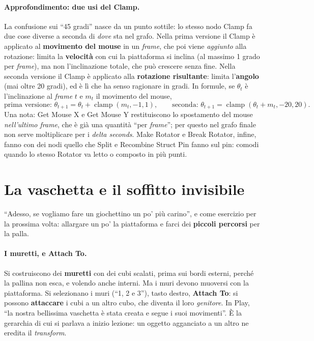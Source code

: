 \paragraph{Approfondimento: due usi del Clamp.} La confusione sui ``45 gradi'' nasce da
un punto sottile: lo stesso nodo Clamp fa due cose diverse a seconda di \emph{dove} sta
nel grafo. Nella prima versione il Clamp è applicato al \textbf{movimento del mouse} in
un \emph{frame}, che poi viene \emph{aggiunto} alla rotazione: limita la
\textbf{velocità} con cui la piattaforma si inclina (al massimo 1 grado per
\emph{frame}), ma non l'inclinazione totale, che può crescere senza fine. Nella seconda
versione il Clamp è applicato alla \textbf{rotazione risultante}: limita
l'\textbf{angolo} (mai oltre 20 gradi), ed è lì che ha senso ragionare in gradi. In
formule, se $\theta_t$ è l'inclinazione al \emph{frame} $t$ e $m_t$ il movimento del
mouse,
\[
  \text{prima versione: } \theta_{t+1} = \theta_t + \operatorname{clamp}(m_t, -1, 1),
  \qquad
  \text{seconda: } \theta_{t+1} = \operatorname{clamp}(\theta_t + m_t, -20, 20).
\]
Una nota: Get Mouse X e Get Mouse Y restituiscono lo spostamento del mouse
\emph{nell'ultimo frame}, che è già una quantità ``per \emph{frame}''; per questo nel
grafo finale non serve moltiplicare per i \emph{delta seconds}. Make Rotator e Break
Rotator, infine, fanno con dei nodi quello che Split e Recombine Struct Pin fanno sul
pin: comodi quando lo stesso Rotator va letto o composto in più punti.

\section{La vaschetta e il soffitto invisibile}
\label{ue2:sec:vaschetta}

``Adesso, se vogliamo fare un giochettino un po' più carino'', e come esercizio per la
prossima volta: allargare un po' la piattaforma e farci dei \textbf{piccoli percorsi}
per la palla.

\paragraph{I muretti, e Attach To.} Si costruiscono dei \textbf{muretti} con dei cubi
scalati, prima sui bordi esterni, perché la pallina non esca, e volendo anche interni.
Ma i muri devono muoversi con la piattaforma. Si selezionano i muri (``1, 2 e 3''), tasto
destro, \textbf{Attach To}: si possono \textbf{attaccare} i cubi a un altro cubo, che
diventa il loro \emph{genitore}. In Play, ``la nostra bellissima vaschetta è stata
creata e segue i suoi movimenti''. È la gerarchia di cui si parlava a inizio lezione: un
oggetto agganciato a un altro ne eredita il \emph{transform}.

